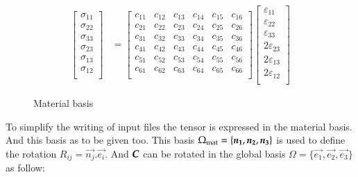 \begin{align}
  \left[\begin{array}{c}
      \sigma_{11}\\
      \sigma_{22}\\
      \sigma_{33}\\
      \sigma_{23}\\
      \sigma_{13}\\
      \sigma_{12}\\
    \end{array}\right]
  &= \left[
    \begin{array}{cccccc}
      c_{11} & c_{12} & c_{13} & c_{14} & c_{15} & c_{16}\\
      c_{21} & c_{22} & c_{23} & c_{24} & c_{25} & c_{26}\\
      c_{31} & c_{32} & c_{33} & c_{34} & c_{35} & c_{36}\\
      c_{41} & c_{42} & c_{43} & c_{44} & c_{45} & c_{46}\\
      c_{51} & c_{52} & c_{53} & c_{54} & c_{55} & c_{56}\\
      c_{61} & c_{62} & c_{63} & c_{64} & c_{65} & c_{66}\\
    \end{array}\right]
  \left[\begin{array}{c}
      \varepsilon_{11}\\
      \varepsilon_{22}\\
      \varepsilon_{33}\\
      2\varepsilon_{23}\\
      2\varepsilon_{13}\\
      2\varepsilon_{12}\\
    \end{array}\right]
\end{align}

\begin{figure}[h]
  \centering
  \caption{Material basis}
\end{figure}

To simplify the writing of input files the  tensor is expressed in the
material basis. And this basis as to be given too. This basis $\Omega_{{\mathrm{mat}}}
= \{\boldsymbol{n_1}, \boldsymbol{n_2}, \boldsymbol{n_3}\}$ is used to define the rotation $R_{ij} =
\vec{n_j} . \vec{e_i}$. And $\boldsymbol{C}$ can be rotated in the global basis $\Omega
= \{\vec{e_1}, \vec{e_2}, \vec{e_3}\}$ as follow:


